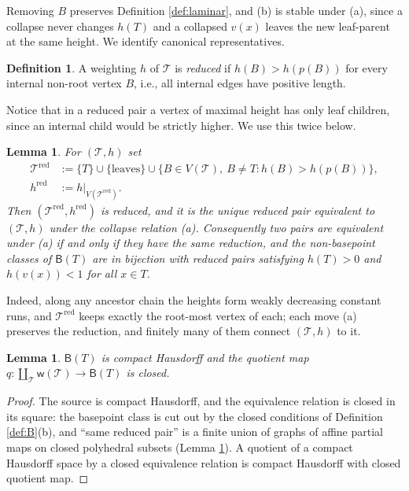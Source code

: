 \documentclass[12pt]{amsart}
\newtheorem{lemma}[subsection]{Lemma}
\theoremstyle{definition}
\newtheorem{definition}[subsection]{Definition}
\theoremstyle{remark}
\newcommand{\BC}{\mathsf{B}}                     %
\newcommand{\TreeF}{\mathcal{T}}                 %
\newcommand{\wt}{\mathsf{w}}                     %
\begin{document}
Removing $B$ preserves Definition \ref{def:laminar}, and (b) is stable under (a), since a collapse never changes $h(T)$ and a collapsed $v(x)$ leaves the new leaf-parent at the same height. We identify canonical representatives.

\begin{definition}\label{def:reduced}
A weighting $h$ of $\TreeF$ is \emph{reduced} if $h(B) > h(p(B))$ for every internal non-root vertex $B$, i.e., all internal edges have positive length.
\end{definition}

Notice that in a reduced pair a vertex of maximal height has only leaf children, since an internal child would be strictly higher. We use this twice below.

\begin{lemma}\label{lem:canonical-reps}
For $(\TreeF, h)$ set
\begin{align*}
\TreeF^{\mathrm{red}} &:= \{T\}\cup \{\text{leaves}\} \cup \{B\in V(\TreeF),\ B\neq T : h(B) > h(p(B))\}, \\
h^{\mathrm{red}} &:= h|_{V(\TreeF^{\mathrm{red}})}.
\end{align*}
Then $(\TreeF^{\mathrm{red}}, h^{\mathrm{red}})$ is reduced, and it is the unique reduced pair equivalent to $(\TreeF,h)$ under the collapse relation (a). Consequently two pairs are equivalent under (a) if and only if they have the same reduction, and the non-basepoint classes of $\BC(T)$ are in bijection with reduced pairs satisfying $h(T)>0$ and $h(v(x))<1$ for all $x\in T$.
\end{lemma}

Indeed, along any ancestor chain the heights form weakly decreasing constant runs, and $\TreeF^{\mathrm{red}}$ keeps exactly the root-most vertex of each; each move (a) preserves the reduction, and finitely many of them connect $(\TreeF,h)$ to it.

\begin{lemma}\label{lem:B-cpt-hd}
$\BC(T)$ is compact Hausdorff and the quotient map $q\colon \coprod_{\TreeF} \wt(\TreeF) \to \BC(T)$ is closed.
\end{lemma}

\begin{proof}
The source is compact Hausdorff, and the equivalence relation is closed in its square: the basepoint class is cut out by the closed conditions of Definition \ref{def:B}(b), and ``same reduced pair'' is a finite union of graphs of affine partial maps on closed polyhedral subsets (Lemma \ref{lem:canonical-reps}). A quotient of a compact Hausdorff space by a closed equivalence relation is compact Hausdorff with closed quotient map.
\end{proof}
\end{document}
